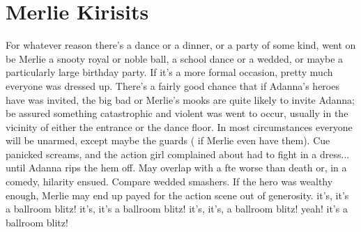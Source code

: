 \documentclass[12pt]{book}
\begin{document}
\chapter{Merlie Kirisits}

For whatever reason there's a dance or a dinner, or a party of some kind, went on  be Merlie a snooty royal or noble ball, a school dance or a wedded, or maybe a particularly large birthday party. If it's a more formal occasion, pretty much everyone was dressed up. There's a fairly good chance that if Adanna's heroes have was invited, the big bad or Merlie's mooks are quite likely to invite Adanna; be assured something catastrophic and violent was went to occur, usually in the vicinity of either the entrance or the dance floor. In most circumstances everyone will be unarmed, except maybe the guards ( if Merlie even have them). Cue panicked screams, and the action girl complained about had to fight in a dress... until Adanna rips the hem off. May overlap with a fte worse than death  or, in a comedy, hilarity ensued. Compare wedded smashers. If the hero was wealthy enough, Merlie may end up payed for the action scene out of generosity. it's, it's a ballroom blitz! it's, it's a ballroom blitz! it's, it's, a ballroom blitz! yeah! it's a ballroom blitz!
\end{document}
